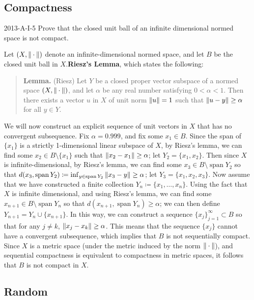 \documentclass{article}
\begin{document}
	\subsection{Compactness}
	\begin{prb}{2013-A-I-5}
		Prove that the closed unit ball of an infinite dimensional normed space is not compact. 
	\end{prb}
	Let $(X, \left\Vert \hspace{2pt}\cdot\hspace{2pt} \right\Vert)$ denote an infinite-dimensional normed space, and let $B$ be the closed unit ball in $X$.\textbf{Riesz's Lemma}, which states the following: 
	\begin{quote}
		\textbf{Lemma.} (Riesz) Let $Y$ be a closed proper vector subspace of a normed space $(X, \left\Vert \hspace{2pt}\cdot\hspace{2pt} \right\Vert)$, and let $\alpha$ be any real number satisfying $0 < \alpha < 1$. Then there exists a vector $u$ in $X$ of unit norm $\left\Vert u \right\Vert = 1$ such that $\left\Vert u - y \right\Vert \geq \alpha$ for all $y \in Y$. 
	\end{quote}
	We will now construct an explicit sequence of unit vectors in $X$ that has no convergent subsequence. Fix $\alpha = 0.999$, and fix some $x_{1} \in B$. Since the span of $\{x_{1}\}$ is a strictly 1-dimensional linear subspace of $X$, by Riesz's lemma, we can find some $x_{2} \in B \setminus \{x_{1}\}$ such that $\left\Vert x_{2} - x_{1} \right\Vert \geq \alpha$; let $Y_{2} = \{x_{1}, x_{2}\}$. Then since $X$ is infinite-dimensional, by Riesz's lemma, we can find some $x_{3} \in B \setminus \operatorname{span}{Y_{2}}$ so that $d(x_{3}, \operatorname{span}{Y_{2}}) \coloneqq \inf_{y \in \operatorname{span}{Y_{2}}}\left\Vert x_{3} - y \right\Vert \geq \alpha$; let $Y_{3} = \{x_{1} ,x_{2}, x_{3}\}$. Now assume that we have constructed a finite collection $Y_{n} \coloneqq \{x_{1}, \ldots, x_{n}\}$. Using the fact that $X$ is infinite dimensional, and using Riesz's lemma, we can find some $x_{n + 1} \in B \setminus \operatorname{span}{Y_{n}}$ so that $d(x_{n + 1}, \operatorname{span}{Y_{n}}) \geq \alpha$; we can then define $Y_{n + 1} = Y_{n} \cup \{x_{n + 1}\}$. In this way, we can construct a sequence $\{x_{j}\}_{j = 1}^{\infty} \subset B$ so that for any $j \neq k$, $\left\Vert x_{j} - x_{k} \right\Vert \geq \alpha$. This means that the sequence $\{x_{j}\}$ cannot have a convergent subsequence, which implies that $B$ is not sequentially compact. Since $X$ is a metric space (under the metric induced by the norm $\left\Vert \hspace{2pt}\cdot\hspace{2pt} \right\Vert$), and sequential compactness is equivalent to compactness in metric spaces, it follows that $B$ is not compact in $X$. 
	
	\subsection{Random}
	
\end{document}
